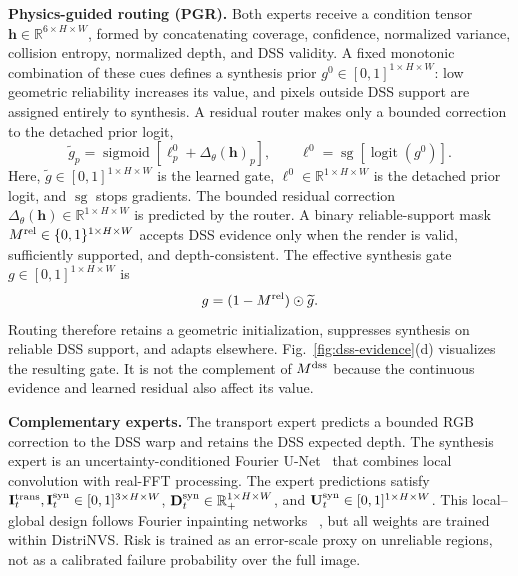 \documentclass[letterpaper,10pt,conference]{ieeeconf}
\newcommand{\R}{\mathbb{R}}
\newcommand{\I}{\mathbf{I}}
\newcommand{\D}{\mathbf{D}}
\newcommand{\U}{\mathbf{U}}
\begin{document}
\textbf{Physics-guided routing (PGR).}
Both experts receive a condition tensor
$\mathbf h\in\R^{6\times H\times W}$, formed by concatenating coverage,
confidence, normalized variance, collision entropy, normalized depth, and DSS
validity. A fixed monotonic combination of these cues defines a synthesis prior
$g^0\in[0,1]^{1\times H\times W}$: low geometric reliability increases its
value, and pixels outside DSS
support are assigned entirely to synthesis. A residual router makes only a
bounded correction to the detached prior logit,
\begin{equation}
 \widetilde g_p=\operatorname{sigmoid}\!\left[
 \ell_p^0+\Delta_\theta(\mathbf h)_p\right],
 \qquad \ell^0=\operatorname{sg}[\operatorname{logit}(g^0)].
\label{eq:router}
\end{equation}
Here, $\widetilde g\in[0,1]^{1\times H\times W}$ is the learned gate,
$\ell^0\in\R^{1\times H\times W}$ is the detached prior logit, and
$\operatorname{sg}$ stops gradients. The bounded residual correction
$\Delta_\theta(\mathbf h)\in\R^{1\times H\times W}$ is predicted by the
router. A binary reliable-support mask
$M^{\rm rel}\in\{0,1\}^{1\times H\times W}$ accepts DSS evidence only when
the render is valid, sufficiently supported, and depth-consistent. The
effective synthesis gate $g\in[0,1]^{1\times H\times W}$ is
\begin{equation}
 g=(1-M^{\rm rel})\odot\widetilde g.
 \label{eq:effective-gate}
\end{equation}
Routing therefore retains a geometric initialization, suppresses synthesis on
reliable DSS support, and adapts elsewhere.
Fig.~\ref{fig:dss-evidence}(d) visualizes the resulting gate. It is not the
complement of $M^{\rm dss}$ because the continuous evidence and learned
residual also affect its value.

\textbf{Complementary experts.}
The transport expert predicts a bounded RGB correction to the DSS warp and
retains the DSS expected depth. The synthesis expert is an
uncertainty-conditioned Fourier U-Net~\cite{ronneberger2015unet} that combines
local convolution with real-FFT processing. The expert predictions satisfy
$\I_t^{\rm trans},\I_t^{\rm syn}\in[0,1]^{3\times H\times W}$,
$\D_t^{\rm syn}\in\R_+^{1\times H\times W}$, and
$\U_t^{\rm syn}\in[0,1]^{1\times H\times W}$.
This local--global design follows Fourier inpainting networks
~\cite{suvorov2022lama,chu2023uffc}, but all weights are trained within
DistriNVS. Risk is trained as an error-scale proxy on unreliable
regions, not as a calibrated failure probability over the full image.
\end{document}
